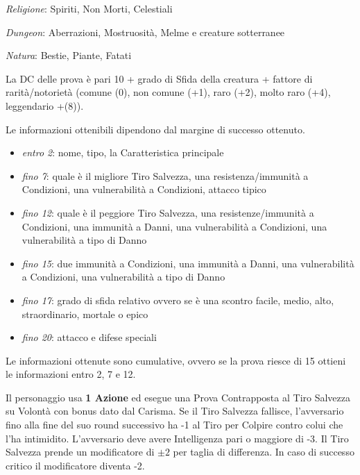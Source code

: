 \documentclass[landscape,10pt,a4paper]{article}
\begin{document}
\begin{multicols}{3}
\begin{dmbox}[title=Riconoscere i mostri - pagina \pageref{riconosceremostro}]
\emph{Religione}: Spiriti, Non Morti, Celestiali

\emph{Dungeon}: Aberrazioni, Mostruosità, Melme e creature sotterranee

\emph{Natura}: Bestie, Piante, Fatati

\medskip

La DC delle prova è pari 10 + grado di Sfida della creatura + fattore di rarità/notorietà (comune (0), non comune (+1), raro (+2), molto raro (+4), leggendario +(8)).

Le informazioni ottenibili dipendono dal margine di successo ottenuto. 

\noindent\begin{itemize}\setlength{\itemsep}{0pt}
\item \emph{entro 2}: nome, tipo, la Caratteristica principale
\item \emph{fino 7}: quale è il migliore Tiro Salvezza, una resistenza/immunità a Condizioni, una vulnerabilità a Condizioni, attacco tipico
\item \emph{fino 12}: quale è il peggiore Tiro Salvezza, una resistenze/immunità a Condizioni, una immunità a Danni, una vulnerabilità a Condizioni, una vulnerabilità a tipo di Danno
\item \emph{fino 15}: due immunità a Condizioni, una immunità a Danni, una vulnerabilità a Condizioni, una vulnerabilità a tipo di Danno
\item \emph{fino 17}: grado di sfida relativo ovvero se è una scontro facile, medio, alto, straordinario, mortale o epico
\item \emph{fino 20}: attacco e difese speciali
\end{itemize}

\medskip

Le informazioni ottenute sono cumulative, ovvero se la prova riesce di 15 ottieni le informazioni entro 2, 7 e 12.
\end{dmbox}


\begin{dmbox}[title=Intimidire - pagina \pageref{intimidire}]
Il personaggio usa \textbf{1 Azione} ed esegue una Prova Contrapposta al Tiro Salvezza su Volontà con bonus dato dal Carisma.
Se il Tiro Salvezza fallisce, l'avversario fino alla fine del suo round successivo ha -1 al Tiro per Colpire contro colui che l'ha intimidito. L'avversario deve avere Intelligenza pari o maggiore di -3. Il Tiro Salvezza prende un modificatore di $\pm2$ per taglia di differenza. In caso di successo critico il modificatore diventa -2. 


\end{dmbox}
\end{multicols}
\end{document}
